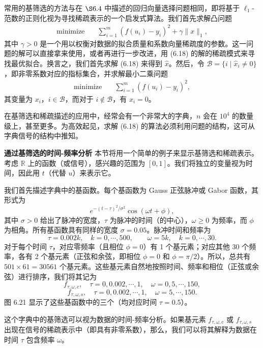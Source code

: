 \documentclass[UTF8,12pt,a4paper,fontset=fandol]{ctexart}
\begin{document}
常用的基筛选的方法与在 $\S 6.4$ 中描述的回归向量选择问题相同，即将基于 $\ell_1$-范数的正则化视为寻找稀疏表示的一个启发式算法。我们首先求解凸问题
\begin{equation}
\begin{aligned}
\text{minimize}\quad & \sum_{i=1}^m(f(u_i)-y_i)^2+\gamma\|x\|_1,
\end{aligned}
\tag{6.18}
\end{equation}
其中 $\gamma>0$ 是一个用以权衡对数据的拟合质量和系数向量稀疏度的参数。这一问题的解可以直接拿来使用，或者再进行一步改进，用 (6.18) 的解的稀疏模式来寻找最优拟合。换言之，我们首先求解 (6.18) 来得到 $\hat{x}$。然后，令 $\mathcal{B}=\{i\mid \hat{x}_i\neq 0\}$，即非零系数对应的指标集合，并求解最小二乘问题
\[
\begin{aligned}
\text{minimize}\quad & \sum_{i=1}^m(f(u_i)-y_i)^2,
\end{aligned}
\]
其变量为 $x_i$，$i\in\mathcal{B}$，而对于 $i\notin\mathcal{B}$，有 $x_i=0$。

在基筛选和稀疏描述的应用中，经常会有一个非常大的字典，$n$ 会在 $10^4$ 的数量级上，甚至更多。为高效起见，求解 (6.18) 的算法必须利用问题的结构，这可从字典信号的结构中推知。

\noindent\textbf{通过基筛选的时间-频率分析}\quad
本节将用一个简单的例子来显示基筛选和稀疏表示。考虑 $\mathbb{R}$ 上的函数（或信号），感兴趣的范围为 $[0,1]$。我们将独立的变量视为时间，因此用 $t$（代替 $u$）来表示它。

我们首先描述字典中的基函数。每个基函数为 Gauss 正弦脉冲或 Gabor 函数，其形式为
\[
e^{-(t-\tau)^2/\sigma^2}\cos(\omega t+\phi),
\]
其中 $\sigma>0$ 给出了脉冲的宽度，$\tau$ 为脉冲的时间（的中心），$\omega\geq 0$ 为频率，而 $\phi$ 为相角。所有基函数具有同样的宽度 $\sigma=0.05$。脉冲时间和频率为
\[
\tau=0.002k,\quad k=0,\cdots,500,\qquad \omega=5k,\quad k=0,\cdots,30.
\]
对于每个时间 $\tau$，对应零频率（且相位 $\phi=0$）有 1 个基元素；对应其他 30 个频率，各有 2 个基元素（正弦和余弦，即相位 $\phi=0$ 和 $\phi=\pi/2$）。所以，总共有 $501\times 61=30561$ 个基元素。这些基元素自然地按照时间、频率和相位（正弦或余弦）进行排序，我们将其记为
\[
f_{\tau,\omega,c},\quad \tau=0,0.002,\cdots,1,\quad \omega=0,5,\cdots,150,
\]
\[
f_{\tau,\omega,s},\quad \tau=0,0.002,\cdots,1,\quad \omega=5,\cdots,150.
\]
图 6.21 显示了这些基函数中的三个（均对应时间 $\tau=0.5$）。

这个字典中的基筛选可以视为数据的时间-频率分析。如果基元素 $f_{\tau,\omega,c}$ 或 $f_{\tau,\omega,s}$ 出现在信号的稀疏表示中（即具有非零系数），那么，我们可以将其解释为数据在时间 $\tau$ 包含频率 $\omega$。
\end{document}
